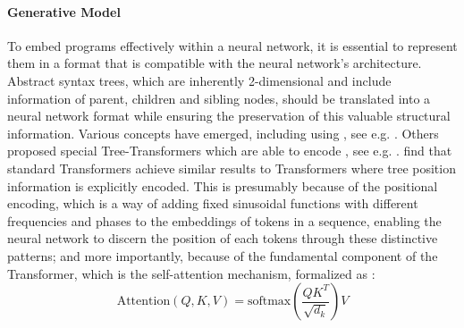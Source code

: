









\paragraph*{Generative Model}\label{sec:gen_model}
To embed programs effectively within a neural network, it is essential to represent them in a format that is compatible with the neural network's architecture. Abstract syntax trees, which are inherently 2-dimensional and include information of parent, children and sibling nodes, should be translated into a neural network format while ensuring the preservation of this valuable structural information.
Various concepts have emerged, including using , see e.g. \cite{allamanis_learning_2018,velickovicCLRSAlgorithmicReasoning2022,bieber_learning_2020,ibarz_generalist_2022}. Others proposed special Tree-Transformers which are able to encode , see e.g. \cite{pengRethinkingPositionalEncoding2022,wang2017dynamic}.
\citet{heTreesTransformersTheoretical2021} find that standard Transformers achieve similar results to Transformers where tree position information is explicitly encoded. This is presumably because of the positional encoding, which is a way of adding fixed sinusoidal functions with different frequencies and phases to the embeddings of tokens in a sequence, enabling the neural network to discern the position of each tokens through these distinctive patterns; and more importantly, because of the fundamental component of the Transformer, which is the self-attention mechanism, formalized as \cite{vaswaniAttentionAllYou2017}:
\begin{equation}
    \text{Attention}(Q, K, V) = \text{softmax}(\frac{QK^T}{\sqrt{d_k}})V
\end{equation}

